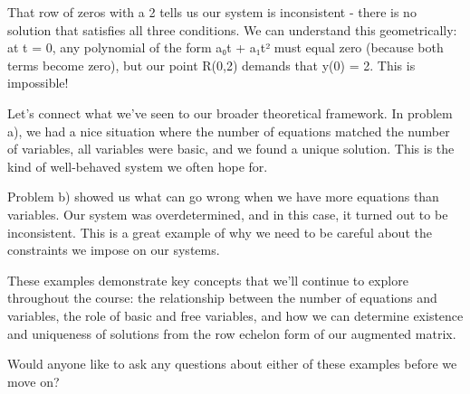 That row of zeros with a 2 tells us our system is inconsistent - there is no solution that satisfies all three conditions. We can understand this geometrically: at t = 0, any polynomial of the form a₀t + a₁t² must equal zero (because both terms become zero), but our point R(0,2) demands that y(0) = 2. This is impossible!

Let's connect what we've seen to our broader theoretical framework. In problem a), we had a nice situation where the number of equations matched the number of variables, all variables were basic, and we found a unique solution. This is the kind of well-behaved system we often hope for.

Problem b) showed us what can go wrong when we have more equations than variables. Our system was overdetermined, and in this case, it turned out to be inconsistent. This is a great example of why we need to be careful about the constraints we impose on our systems.

These examples demonstrate key concepts that we'll continue to explore throughout the course: the relationship between the number of equations and variables, the role of basic and free variables, and how we can determine existence and uniqueness of solutions from the row echelon form of our augmented matrix.

Would anyone like to ask any questions about either of these examples before we move on?